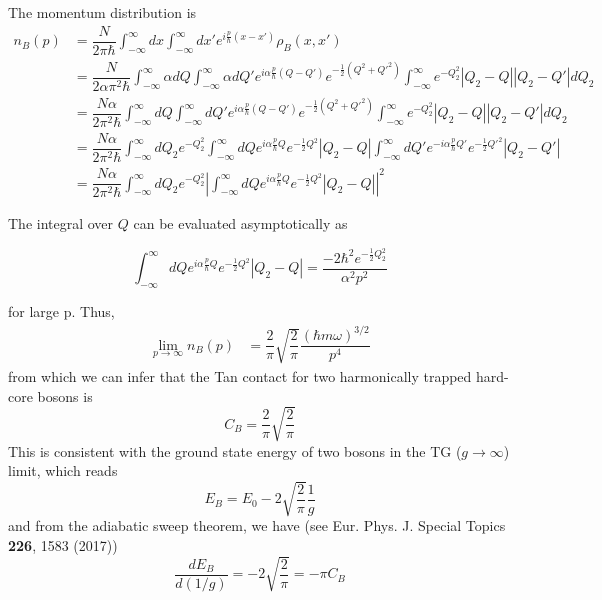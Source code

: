 \documentclass[onecolumn,english,aps,pra]{revtex4}
\begin{document}
The momentum distribution is
\begin{align*}
n_{B}(p) &= \dfrac{N}{2 \pi \hbar} \int_{-\infty}^{\infty} dx \int_{-\infty}^{\infty} dx' e^{i \frac{p}{\hbar} (x - x')} \rho_{B}(x,x')\\
& = \dfrac{N}{2 \alpha \pi^2 \hbar} \int_{-\infty}^{\infty} \alpha dQ \int_{-\infty}^{\infty} \alpha dQ' e^{i \alpha \frac{p}{\hbar} (Q - Q')}  e^{-\frac{1}{2} (Q^2 + Q'^2)} \int_{-\infty}^{\infty} e^{-Q_{2}^{2}} |Q_{2} - Q| |Q_{2} - Q'| dQ_{2}\\
& = \dfrac{N\alpha }{2 \pi^2 \hbar} \int_{-\infty}^{\infty} dQ \int_{-\infty}^{\infty} dQ' e^{i \alpha \frac{p}{\hbar} (Q - Q')}  e^{-\frac{1}{2} (Q^2 + Q'^2)} \int_{-\infty}^{\infty} e^{-Q_{2}^{2}} |Q_{2} - Q| |Q_{2} - Q'| dQ_{2}\\
& =  \dfrac{N\alpha }{2 \pi^2 \hbar} \int_{-\infty}^{\infty}  dQ_{2} e^{-Q_{2}^2} \int_{-\infty}^{\infty} dQ  e^{i \alpha \frac{p}{\hbar} Q} e^{-\frac{1}{2}Q^2} |Q_{2} - Q|  \int_{-\infty}^{\infty} dQ'  e^{-i \alpha \frac{p}{\hbar} Q'} e^{-\frac{1}{2}Q'^2} |Q_{2} - Q'| \\
& = \dfrac{N\alpha }{2 \pi^2 \hbar} \int_{-\infty}^{\infty}  dQ_{2} e^{-Q_{2}^2} \left| \int_{-\infty}^{\infty} dQ  e^{i \alpha \frac{p}{\hbar} Q} e^{-\frac{1}{2}Q^2} |Q_{2} - Q| \right|^2
\end{align*}

The integral over $Q$ can be evaluated asymptotically as

\begin{equation}
\int_{-\infty}^{\infty} dQ  e^{i \alpha \frac{p}{\hbar} Q} e^{-\frac{1}{2}Q^2} |Q_{2} - Q| = \dfrac{-2 \hbar ^2 e^{-\frac{1}{2} Q_{2}^2}}{\alpha^2 p^2}
\end{equation}

for large p. Thus,
\begin{align}
\lim_{p \rightarrow \infty} n_{B}(p) & = 
\dfrac{2}{\pi} \sqrt{\dfrac{2}{\pi}} \dfrac{(\hbar m \omega)^{3/2}}{p^4}
\end{align}
%
from which we can infer that the Tan contact for two harmonically trapped hard-core bosons is
\[ 
C_{B}= \dfrac{2}{\pi} \sqrt{\dfrac{2}{\pi}}
\]
This is consistent with the ground state energy of two bosons in the TG ($g \rightarrow \infty$) limit, which reads
\[ 
E_{B} = E_{0} - 2 \sqrt{\dfrac{2}{\pi}}\dfrac{1}{g}
\]
and from the adiabatic sweep theorem, we have (see Eur. Phys. J. Special Topics \textbf{226}, 1583 (2017))
\[
\dfrac{dE_{B}}{d(1/g)} = -2\sqrt{\dfrac{2}{\pi}} = - \pi C_{B}
\]
\end{document}
